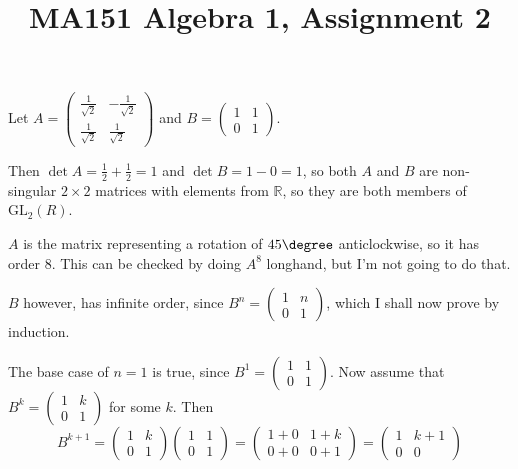 \documentclass[a4paper]{article}
\title{MA151 Algebra 1, Assignment 2}
\begin{document}
\maketitle

\setlength{\parindent}{0em}
\setlength{\parskip}{1em}


Let $A = \begin{pmatrix} \frac1{\sqrt2} & -\frac1{\sqrt2}\\ \frac1{\sqrt2} & \frac1{\sqrt2} \end{pmatrix}$ and $B = \begin{pmatrix} 1 & 1\\ 0 & 1 \end{pmatrix}$.

Then $\det A = \frac12 + \frac12 = 1$ and $\det B = 1 - 0 = 1$, so both $A$ and $B$ are non-singular $2 \times 2$ matrices with elements from $\mathbb R$, so they are both members of $\text{GL}_2(R)$.

$A$ is the matrix representing a rotation of $45\degree$ anticlockwise, so it has order 8. This can be checked by doing $A^8$ longhand, but I'm not going to do that.

$B$ however, has infinite order, since $B^n = \begin{pmatrix} 1 & n\\ 0 & 1 \end{pmatrix}$, which I shall now prove by induction.

The base case of $n=1$ is true, since $B^1 = \begin{pmatrix} 1 & 1\\ 0 & 1 \end{pmatrix}$. Now assume that $B^k = \begin{pmatrix} 1 & k\\ 0 & 1 \end{pmatrix}$ for some $k$. Then $$B^{k+1} = \begin{pmatrix} 1 & k\\ 0 & 1 \end{pmatrix} \begin{pmatrix} 1 & 1\\ 0 & 1 \end{pmatrix} = \begin{pmatrix} 1+0 & 1+k\\ 0+0 & 0+1 \end{pmatrix} = \begin{pmatrix} 1 & k+1\\ 0 & 0 \end{pmatrix}$$
\end{document}

